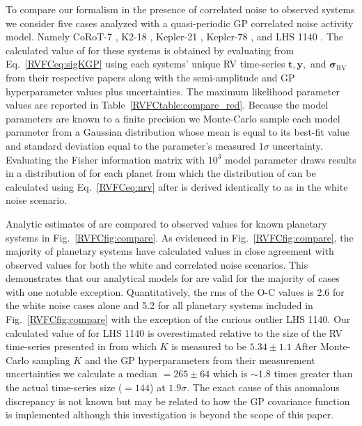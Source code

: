 To compare our formalism in the presence of correlated noise to observed systems we consider five cases analyzed
with a quasi-periodic GP correlated noise activity model. Namely CoRoT-7 \citep{haywood14},
K2-18 \citep{cloutier17b}, Kepler-21 \citep{lopezmorales16}, Kepler-78 \citep{grunblatt15}, and
LHS 1140 \citep{dittmann17}. The calculated value of \nrv{} for these systems is obtained by evaluating
\sigK{} from Eq.~\ref{RVFCeq:sigKGP} using each systems' unique RV time-series $\mathbf{t},\mathbf{y},$ and
$\boldsymbol{\sigma}_{\text{RV}}$ from their
respective papers along with the semi-amplitude and GP hyperparameter values plus uncertainties.
The maximum likelihood parameter values are reported in Table~\ref{RVFCtable:compare_red}.
Because the model parameters are known to a finite precision we Monte-Carlo sample each model parameter
from a Gaussian distribution
whose mean is equal to its best-fit value and standard deviation equal to the parameter's measured $1\sigma$
uncertainty. Evaluating the Fisher information matrix with $10^3$ model parameter draws results in a
distribution of \sigK{} for each planet from which the distribution of \nrv{} can be calculated using
Eq.~\ref{RVFCeq:nrv} after \sigeff{} is derived identically to as in the white noise scenario.



Analytic estimates of \nrv{} are compared to observed values for known planetary
systems in Fig.~\ref{RVFCfig:compare}. As evidenced in Fig.~\ref{RVFCfig:compare}, the majority of planetary systems
have calculated \nrv{} values in close agreement with observed values for both the white and correlated noise
scenarios. 
This demonstrates that our analytical models for \nrv{} are valid for the majority of cases
with one notable exception. Quantitatively, the rms of the O-C \nrv{} values is 2.6 for the white noise
cases alone and 5.2 for all planetary systems included in Fig.~\ref{RVFCfig:compare} with the exception of
the curious outlier LHS 1140.
Our calculated value of \nrv{} for LHS 1140 is overestimated relative to the
size of the RV time-series presented in \cite{dittmann17} from which $K$ is measured to be $5.34 \pm 1.1$
 After Monte-Carlo sampling $K$ and the GP hyperparameters from their measurement
uncertainties we calculate a median \nrv{}$=265 \pm 64$ which is $\sim 1.8$ times greater than the actual
time-series size (\nrv{}$=144$) at $1.9\sigma$. The exact cause of this anomalous discrepancy is not known
but may be related to how the GP covariance function is implemented although this investigation is
beyond the scope of this paper. 


